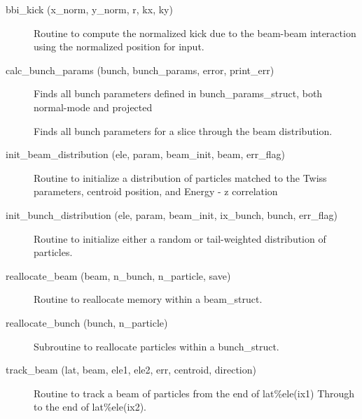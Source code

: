 \begin{description}

\label{r:bbi.kick}
\item[bbi_kick (x_norm, y_norm, r, kx, ky)] \Newline 
Routine to compute the normalized kick due to the beam-beam
interaction using the normalized position for input.

\label{r:calc.bunch.params}
\item[calc_bunch_params (bunch, bunch_params, error, print_err)] \Newline 
Finds all bunch parameters defined in bunch_params_struct, both normal-mode
and projected

\label{r:calc.bunch.params.slice}
\item[\protect\parbox{6in}{
    calc_bunch_params (bunch, bunch_params, plane, slice_center, \\
    \hspace*{1in} slice_spread, err, print_err) }] \Newline 
Finds all bunch parameters for a slice through the beam distribution.

\label{r:init.beam.distribution}
\item[init_beam_distribution (ele, param, beam_init, beam, err_flag)] \Newline 
Routine to initialize a distribution of particles matched to
the Twiss parameters, centroid position, and Energy - z correlation

\label{r:init.bunch.distribution}
\item[init_bunch_distribution (ele, param, beam_init, ix_bunch, bunch, err_flag)] \Newline 
Routine to initialize either a random or tail-weighted distribution of particles.  

\label{r:reallocate.beam}
\item[reallocate_beam (beam, n_bunch, n_particle, save)] \Newline 
Routine to reallocate memory within a beam_struct.

\label{r:reallocate.bunch}
\item[reallocate_bunch (bunch, n_particle)] \Newline 
Subroutine to reallocate particles within a bunch_struct.

\label{r:track.beam}
\item[track_beam (lat, beam, ele1, ele2, err, centroid, direction)] \Newline 
     Routine to track a beam of particles from the end of
     lat\%ele(ix1) Through to the end of lat\%ele(ix2).

\end{description}

